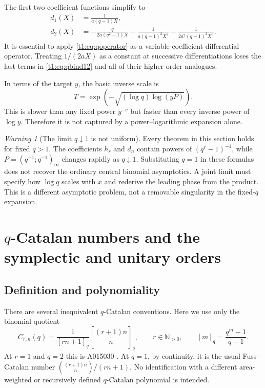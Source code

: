 \documentclass[11pt,openany]{book}
\numberwithin{equation}{chapter}
\theoremstyle{plain}
\theoremstyle{definition}
\theoremstyle{remark}
\newtheorem{warning}[theorem]{Warning}
\newcommand{\N}{\mathbb N}\newcommand{\R}{\mathbb R}\newcommand{\C}{\mathbb C}\newcommand{\Z}{\mathbb Z}
\newcommand{\qbinq}[2]{\genfrac{[}{]}{0pt}{}{#1}{#2}_{q}}   %
\begin{document}
The first two coefficient functions simplify to
\begin{align}
 d_1(X)&=\frac1{a(q-1)X},\nonumber\\
 d_2(X)&=-\frac{q}{2a(q^2-1)X}
 -\frac1{a(q-1)^2X^2}
 -\frac1{2a^2(q-1)^2X^3}.
 \label{t1:eq:qbind12}
\end{align}
It is essential to apply \eqref{t1:eq:qoperator} as a variable-coefficient differential operator. Treating $1/(2aX)$ as a constant at successive differentiations loses the last terms in \eqref{t1:eq:qbind12} and all of their higher-order analogues.

In terms of the target $y$, the basic inverse scale is
\begin{equation}
 T=\exp\!\left(-\sqrt{(\log q)\log(yP)}\right).
 \label{t1:eq:qbinscale}
\end{equation}
This is slower than any fixed power $y^{-c}$ but faster than every inverse power of $\log y$. Therefore it is not captured by a power--logarithmic expansion alone.

\begin{warning}[The limit $q\downarrow1$ is not uniform]
Every theorem in this section holds for fixed $q>1$. The coefficients $h_r$ and $d_n$ contain powers of $(q^r-1)^{-1}$, while $P=(q^{-1};q^{-1})_\infty$ changes rapidly as $q\downarrow1$. Substituting $q=1$ in these formulas does not recover the ordinary central binomial asymptotics. A joint limit must specify how $\log q$ scales with $x$ and rederive the leading phase from the product. This is a different asymptotic problem, not a removable singularity in the fixed-$q$ expansion.
\end{warning}

\chapter{$q$-Catalan numbers and the symplectic and unitary orders}
\label{ct:ch:qcatalan}

\label{t3:sec:catalan}

\section{Definition and polynomiality}

There are several inequivalent $q$-Catalan conventions. Here we use only the binomial quotient
\begin{equation}\label{t3:eq:qfuss-definition}
 C_{r,n}(q)=\frac1{[rn+1]_q}\qbinq{(r+1)n}{n},
 \qquad r\in\N_{>0},\qquad
 [m]_q=\frac{q^m-1}{q-1}.
\end{equation}
At $r=1$ and $q=2$ this is A015030 \cite{oeisqcatalan}. At $q=1$, by continuity, it is the usual Fuss--Catalan number
$\binom{(r+1)n}{n}/(rn+1)$. No identification with a different area-weighted or recursively defined $q$-Catalan polynomial is intended.
\end{document}
